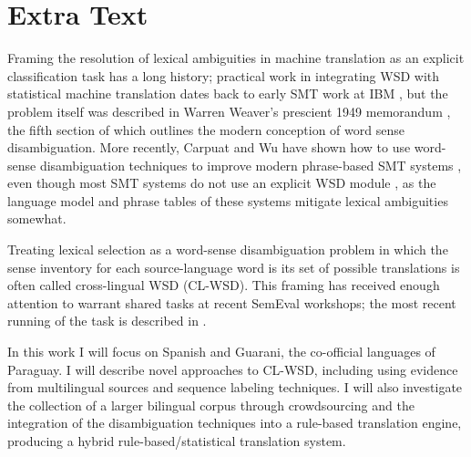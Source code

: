 \documentclass{article}
\begin{document}
\section{Extra Text}
Framing the resolution of lexical ambiguities in machine translation as an
explicit classification task has a long history; practical work in integrating
WSD with statistical machine translation dates back to early SMT work at IBM
\cite{Brown91word-sensedisambiguation}, but the problem itself was described in
Warren Weaver's prescient 1949 memorandum \cite{warrenmemo}, the fifth section
of which outlines the modern conception of word sense disambiguation.  More
recently, Carpuat and Wu have shown how to use word-sense disambiguation
techniques to improve modern phrase-based SMT systems \cite{carpuatpsd}, even
though most SMT systems do not use an explicit WSD module \cite{wsdchap3}, as
the language model and phrase tables of these systems mitigate lexical
ambiguities somewhat.

Treating lexical selection as a word-sense disambiguation problem in which the
sense inventory for each source-language word is its set of possible
translations is often called cross-lingual WSD (CL-WSD). This framing has
received enough attention to warrant shared tasks at recent SemEval workshops;
the most recent running of the task is described in \cite{task10}.

In this work I will focus on Spanish and Guarani, the co-official languages of
Paraguay.  I will describe novel approaches to CL-WSD, including using evidence
from multilingual sources and sequence labeling techniques. I will also
investigate the collection of a larger bilingual corpus through crowdsourcing
and the integration of the disambiguation techniques into a rule-based
translation engine, producing a hybrid rule-based/statistical translation
system.

\nocite{*}

{}
\end{document}
